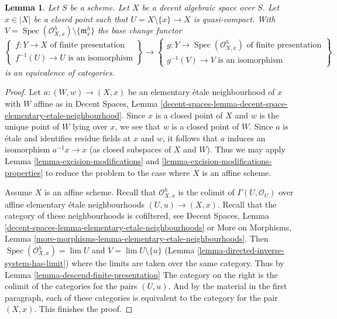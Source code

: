 \documentclass{stacks-project}
\theoremstyle{plain}
\newtheorem{lemma}[subsection]{Lemma}
\theoremstyle{definition}
\theoremstyle{remark}
\numberwithin{equation}{subsection}
\def\lim{\mathop{\mathrm{lim}}\nolimits}
\def\Spec{\mathop{\mathrm{Spec}}}
\begin{document}
\begin{lemma}
\label{lemma-modifications}
Let $S$ be a scheme. Let $X$ be a decent algebraic space over $S$.
Let $x \in |X|$ be a closed point such that $U = X \setminus \{x\} \to X$
is quasi-compact. With
$V = \Spec(\mathcal{O}_{X, x}^h) \setminus \{\mathfrak m_x^h\}$
the base change functor
$$
\left\{
\begin{matrix}
f : Y \to X\text{ of finite presentation} \\
f^{-1}(U) \to U\text{ is an isomorphism}
\end{matrix}
\right\}
\longrightarrow
\left\{
\begin{matrix}
g : Y \to \Spec(\mathcal{O}_{X, x}^h)\text{ of finite presentation} \\
g^{-1}(V) \to V\text{ is an isomorphism}
\end{matrix}
\right\}
$$
is an equivalence of categories.
\end{lemma}

\begin{proof}
Let $a : (W, w) \to (X, x)$ be an elementary \'etale neighbourhood of $x$
with $W$ affine as in
Decent Spaces, Lemma
\ref{decent-spaces-lemma-decent-space-elementary-etale-neighbourhood}.
Since $x$ is a closed point of $X$ and $w$ is the unique point of $W$
lying over $x$, we see that $w$ is a closed point of $W$. Since $a$
is \'etale and identifies residue fields at $x$ and $w$, it
follows that $a$ induces an isomorphism $a^{-1}x \to x$ (as closed
subspaces of $X$ and $W$). Thus we may apply
Lemma \ref{lemma-excision-modifications} and
\ref{lemma-excision-modifications-properties}
to reduce the problem to the case where $X$ is an affine scheme.

\medskip\noindent
Assume $X$ is an affine scheme. Recall that $\mathcal{O}_{X, x}^h$
is the colimit of $\Gamma(U, \mathcal{O}_U)$ over affine
elementary \'etale neighbourhoods $(U, u) \to (X, x)$.
Recall that the category of these neighbourhoods is
cofiltered, see Decent Spaces, Lemma
\ref{decent-spaces-lemma-elementary-etale-neighbourhoods} or
More on Morphisms, Lemma
\ref{more-morphisms-lemma-elementary-etale-neighbourhoods}.
Then $\Spec(\mathcal{O}_{X, x}^h) = \lim U$ and
$V = \lim U \setminus \{u\}$
(Lemma \ref{lemma-directed-inverse-system-has-limit})
where the limits are taken over the same category. Thus by
Lemma \ref{lemma-descend-finite-presentation}
The category on the right is the colimit of the categories
for the pairs $(U, u)$. And by the material in the first
paragraph, each of these categories is equivalent to the
category for the pair $(X, x)$. This finishes the proof.
\end{proof}
\end{document}
